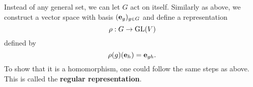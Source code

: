 	Instead of any general set, we can let $G$ act on itself. Similarly as above, we construct a vector space with basis $( \mathbf{e}_g )_{g \in G}$ and define a representation
	\[
		\rho: G \rightarrow \text{GL}(V)
	\]
	defined by
	\[
		\rho(g)(\mathbf{e}_h) = \mathbf{e}_{gh}.
	\]
	To show that it is a homomorphism, one could follow the same steps as above. This is called the \textbf{regular representation}.
	
%
%
%
%
%
%	
%	
%	
%	
%	
%	
